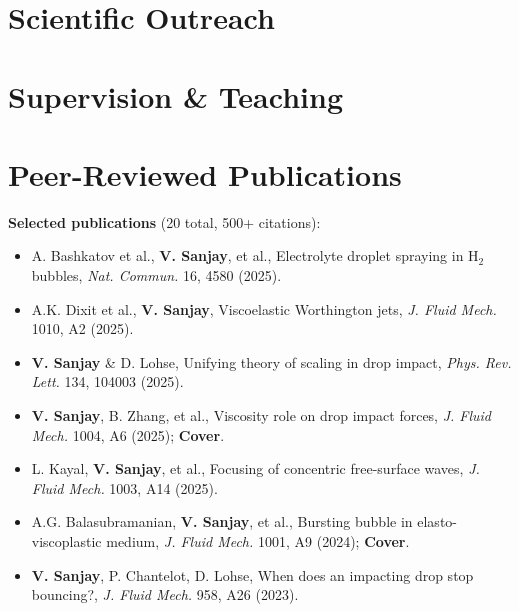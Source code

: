 \documentclass[10pt,a4paper,colorlinks,linkcolor=blue,urlcolor=blue]{moderncv}
\begin{document}
\section{Scientific Outreach}

\section{Supervision \& Teaching}


\section{Peer-Reviewed Publications}

\textbf{Selected publications} (20 total, 500+ citations):
\begin{itemize}[leftmargin=1em, itemsep=0pt]
\item A. Bashkatov et al., \textbf{V. Sanjay}, et al., Electrolyte droplet spraying in H$_2$ bubbles, \textit{Nat. Commun.} 16, 4580 (2025).
\item A.K. Dixit et al., \textbf{V. Sanjay}, Viscoelastic Worthington jets, \textit{J. Fluid Mech.} 1010, A2 (2025).
\item \textbf{V. Sanjay} \& D. Lohse, Unifying theory of scaling in drop impact, \textit{Phys. Rev. Lett.} 134, 104003 (2025).
\item \textbf{V. Sanjay}, B. Zhang, et al., Viscosity role on drop impact forces, \textit{J. Fluid Mech.} 1004, A6 (2025); \textbf{Cover}.
\item L. Kayal, \textbf{V. Sanjay}, et al., Focusing of concentric free-surface waves, \textit{J. Fluid Mech.} 1003, A14 (2025).
\item A.G. Balasubramanian, \textbf{V. Sanjay}, et al., Bursting bubble in elasto-viscoplastic medium, \textit{J. Fluid Mech.} 1001, A9 (2024); \textbf{Cover}.
\item \textbf{V. Sanjay}, P. Chantelot, D. Lohse, When does an impacting drop stop bouncing?, \textit{J. Fluid Mech.} 958, A26 (2023).
\end{itemize}
\end{document}

